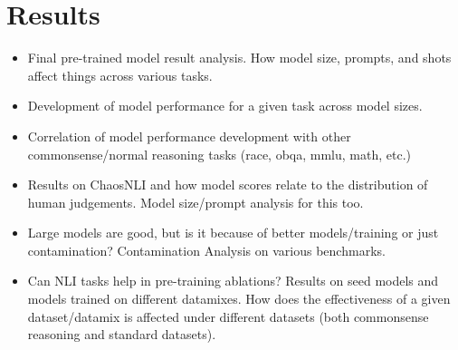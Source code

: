 \section{Results}

\begin{itemize}
  \item Final pre-trained model result analysis. How model size, prompts, and shots affect things across various tasks.
  \item Development of model performance for a given task across model sizes.
  \item Correlation of model performance development with other commonsense/normal reasoning tasks (race, obqa, mmlu, math, etc.)
  \item Results on ChaosNLI and how model scores relate to the distribution of human judgements. Model size/prompt analysis for this too.
  \item Large models are good, but is it because of better models/training or just contamination? Contamination Analysis on various benchmarks.
  \item Can NLI tasks help in pre-training ablations? Results on seed models and models trained on different datamixes. How does the effectiveness of a given dataset/datamix is affected under different datasets (both commonsense reasoning and standard datasets).
\end{itemize}

